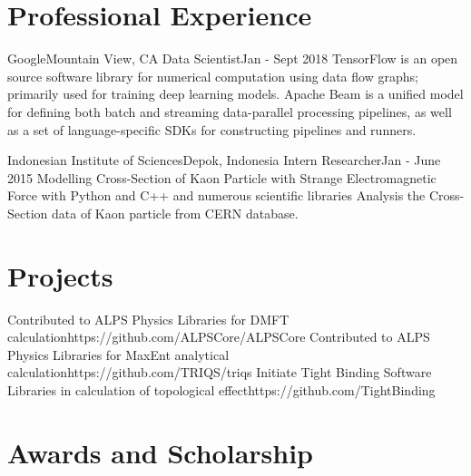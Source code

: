 \documentclass[letterpaper,11pt]{article}
\begin{document}
\section{Professional Experience}
\resumeSubHeadingListStart

    \resumeSubheading
      {Google}{Mountain View, CA}
      {Data Scientist}{Jan - Sept 2018}
      \resumeItemListStart
          {TensorFlow is an open source software library for numerical computation using data flow graphs; primarily used for training deep learning models.}
          {Apache Beam is a unified model for defining both batch and streaming data-parallel processing pipelines, as well as a set of language-specific SDKs for constructing pipelines and runners.}
      \resumeItemListEnd

    \resumeSubheading
      {Indonesian Institute of Sciences}{Depok, Indonesia}
      {Intern Researcher}{Jan - June 2015}
      \resumeItemListStart
          {Modelling Cross-Section of Kaon Particle with Strange Electromagnetic Force with Python and C++ and numerous scientific libraries}
          {Analysis the Cross-Section data of Kaon particle from CERN database.}
      \resumeItemListEnd

\resumeSubHeadingListEnd

\section{Projects}
  \resumeSubHeadingListStart
      {Contributed to ALPS Physics Libraries for DMFT calculation}{https://github.com/ALPSCore/ALPSCore}
      {Contributed to ALPS Physics Libraries for MaxEnt analytical calculation}{https://github.com/TRIQS/triqs}
      {Initiate Tight Binding Software Libraries in calculation of topological effect}{https://github.com/TightBinding}
  \resumeSubHeadingListEnd
  
  
\section{Awards and Scholarship}
\end{document}
